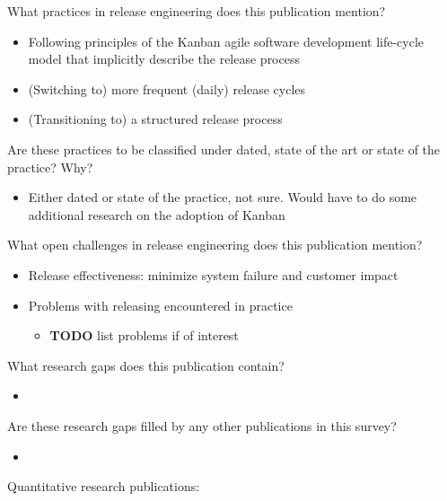 \documentclass[]{book}
\providecommand{\tightlist}{%
  \setlength{\itemsep}{0pt}\setlength{\parskip}{0pt}}
\begin{document}
What practices in release engineering does this publication mention?

\begin{itemize}
\tightlist
\item
  Following principles of the Kanban agile software development
  life-cycle model that implicitly describe the release process
\item
  (Switching to) more frequent (daily) release cycles
\item
  (Transitioning to) a structured release process
\end{itemize}

Are these practices to be classified under dated, state of the art or
state of the practice? Why?

\begin{itemize}
\tightlist
\item
  Either dated or state of the practice, not sure. Would have to do some
  additional research on the adoption of Kanban
\end{itemize}

What open challenges in release engineering does this publication
mention?

\begin{itemize}
\tightlist
\item
  Release effectiveness: minimize system failure and customer impact
\item
  Problems with releasing encountered in practice

  \begin{itemize}
  \tightlist
  \item
    \textbf{TODO} list problems if of interest
  \end{itemize}
\end{itemize}

What research gaps does this publication contain?

\begin{itemize}
\item
\end{itemize}

Are these research gaps filled by any other publications in this survey?

\begin{itemize}
\item
\end{itemize}

Quantitative research publications:
\end{document}
